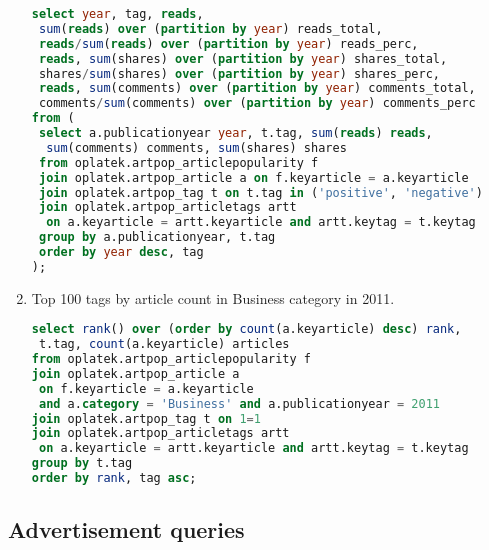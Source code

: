 \begin{enumerate}
\begin{lstlisting}[language=sql]
select year, tag, reads, 
 sum(reads) over (partition by year) reads_total, 
 reads/sum(reads) over (partition by year) reads_perc,
 reads, sum(shares) over (partition by year) shares_total, 
 shares/sum(shares) over (partition by year) shares_perc,
 reads, sum(comments) over (partition by year) comments_total, 
 comments/sum(comments) over (partition by year) comments_perc
from (
 select a.publicationyear year, t.tag, sum(reads) reads, 
  sum(comments) comments, sum(shares) shares
 from oplatek.artpop_articlepopularity f
 join oplatek.artpop_article a on f.keyarticle = a.keyarticle
 join oplatek.artpop_tag t on t.tag in ('positive', 'negative')
 join oplatek.artpop_articletags artt 
  on a.keyarticle = artt.keyarticle and artt.keytag = t.keytag 
 group by a.publicationyear, t.tag
 order by year desc, tag
);
\end{lstlisting}
\item   Top 100 tags by article count in Business category in 2011.
\begin{lstlisting}[language=sql] 
select rank() over (order by count(a.keyarticle) desc) rank, 
 t.tag, count(a.keyarticle) articles
from oplatek.artpop_articlepopularity f
join oplatek.artpop_article a 
 on f.keyarticle = a.keyarticle 
 and a.category = 'Business' and a.publicationyear = 2011
join oplatek.artpop_tag t on 1=1
join oplatek.artpop_articletags artt 
 on a.keyarticle = artt.keyarticle and artt.keytag = t.keytag
group by t.tag
order by rank, tag asc;
\end{lstlisting}
\end{enumerate}

\subsection*{Advertisement  queries} %
\label{sub:Advertisement queries}


